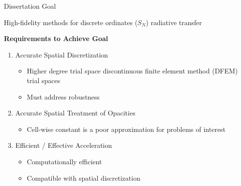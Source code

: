 \documentclass{beamer}
\begin{document}
\begin{frame}
\begin{block}{Dissertation Goal}
\begin{center}
High-fidelity methods for discrete ordinates ($S_N$) radiative transfer
\end{center}
\end{block}
\begin{center}
\begin{Large}
\bf
Requirements to Achieve Goal
\end{Large}
\end{center}
\begin{enumerate}
\item Accurate Spatial Discretization
\begin{itemize}
\item Higher degree trial space discontinuous finite element method (DFEM) trial spaces
\item Must address robustness
\end{itemize}
\item Accurate Spatial Treatment of Opacities
\begin{itemize}
\item Cell-wise constant is a poor approximation for problems of interest
\end{itemize}
\item Efficient / Effective Acceleration
\begin{itemize}
\item Computationally efficient
\item Compatible with spatial discretization
\end{itemize}
\end{enumerate}

\end{frame}
\end{document}
